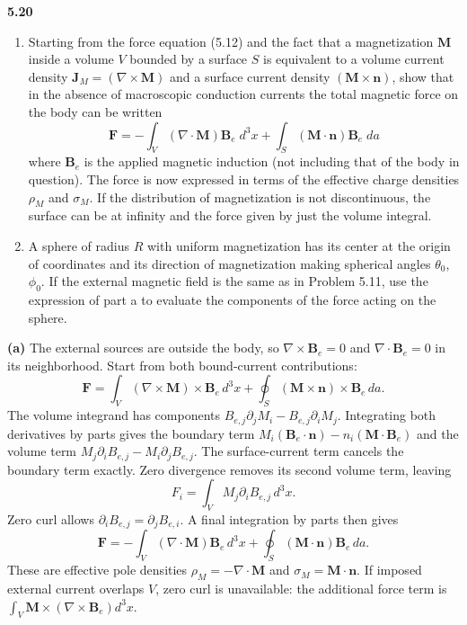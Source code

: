 \par\bigskip
\noindent\textbf{5.20}\quad\begin{enumerate}
\item[(a)] Starting from the force equation (5.12) and the fact that a magnetization $\mathbf{M}$ inside a volume $V$ bounded by a surface $S$ is equivalent to a volume current density $\mathbf{J}_{M}=(\nabla\times\mathbf{M})$ and a surface current density $(\mathbf{M}\times\mathbf{n})$, show that in the absence of macroscopic conduction currents the total magnetic force on the body can be written
\[
\mathbf{F}=-\int_{V}(\nabla\cdot\mathbf{M})\mathbf{B}_{e}\;d^{3}x+\int_{S}(\mathbf{M}\cdot\mathbf{n})\mathbf{B}_{e}\;da
\]
where $\mathbf{B}_{e}$ is the applied magnetic induction (not including that of the body in question). The force is now expressed in terms of the effective charge densities $\rho_{M}$ and $\sigma_{M}$. If the distribution of magnetization is not discontinuous, the surface can be at infinity and the force given by just the volume integral.
\item[(b)] A sphere of radius $R$ with uniform magnetization has its center at the origin of coordinates and its direction of magnetization making spherical angles $\theta_{0}$, $\phi_{0}$. If the external magnetic field is the same as in Problem 5.11, use the expression of part a to evaluate the components of the force acting on the sphere.
\end{enumerate}
\solution
\textbf{(a)} The external sources are outside the body, so
$\nabla\times\mathbf B_e=0$ and $\nabla\cdot\mathbf B_e=0$ in its
neighborhood. Start from both bound-current contributions:
\[
\mathbf F=\int_V(\nabla\times\mathbf M)\times\mathbf B_e\,d^3x
+\oint_S(\mathbf M\times\mathbf n)\times\mathbf B_e\,da.
\]
The volume integrand has components
$B_{e,j}\partial_jM_i-B_{e,j}\partial_iM_j$.
Integrating both derivatives by parts gives the boundary term
$M_i(\mathbf B_e\cdot\mathbf n)-n_i(\mathbf M\cdot\mathbf B_e)$
and the volume term
$M_j\partial_iB_{e,j}-M_i\partial_jB_{e,j}$.
The surface-current term cancels the boundary term exactly.
Zero divergence removes its second volume term, leaving
\[
F_i=\int_VM_j\partial_iB_{e,j}\,d^3x.
\]
Zero curl allows $\partial_iB_{e,j}=\partial_jB_{e,i}$.
A final integration by parts then gives
\[
\boxed{\mathbf F=-\int_V(\nabla\cdot\mathbf M)\mathbf B_e\,d^3x
+\oint_S(\mathbf M\cdot\mathbf n)\mathbf B_e\,da.}
\]
These are effective pole densities $\rho_M=-\nabla\cdot\mathbf M$
and $\sigma_M=\mathbf M\cdot\mathbf n$.
If imposed external current overlaps $V$, zero curl is unavailable:
the additional force term is $\int_V\mathbf M\times(\nabla\times\mathbf B_e)d^3x$.

